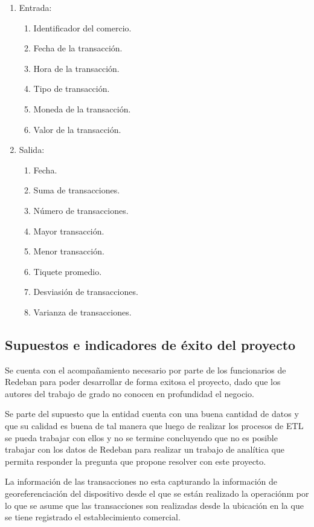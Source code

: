\documentclass[a4paper]{article}
\begin{document}
\begin{enumerate}
	\item Entrada:
	\begin{enumerate}
		\item Identificador del comercio.
		\item Fecha de la transacción.
		\item Hora de la transacción.
		\item Tipo de transacción.
		\item Moneda de la transacción.
		\item Valor de la transacción.
	\end{enumerate}
	\item Salida:
	\begin{enumerate}
		\item Fecha.
		\item Suma de transacciones.
		\item Número de transacciones.
		\item Mayor transacción.
		\item Menor transacción.
		\item Tiquete promedio.
		\item Desviasión de transacciones.
		\item Varianza de transacciones.
	\end{enumerate}
\end{enumerate}


\subsection{Supuestos e indicadores de éxito del proyecto}

Se cuenta con el acompañamiento necesario por parte de los funcionarios de Redeban para poder desarrollar de forma exitosa el proyecto, dado que los autores del trabajo de grado no conocen en profundidad el negocio.

Se parte del supuesto que la entidad cuenta con una buena cantidad de datos y que su calidad es buena de tal manera que luego de realizar los procesos de ETL se pueda trabajar con ellos y no se termine concluyendo que no es posible trabajar con los datos de Redeban para realizar un trabajo de analítica que permita responder la pregunta que propone resolver con este proyecto.

La información de las transacciones no esta capturando la información de georeferenciación del dispositivo desde el que se están realizado la operaciónm por lo que se asume que las transacciones son realizadas desde la ubicación en la que se tiene registrado el establecimiento comercial.
\end{document}
